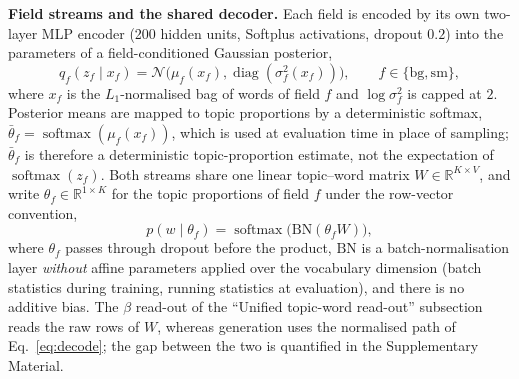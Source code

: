 \documentclass[Journal,letterpaper,NoLists]{ascelike-new}
\begin{document}
\noindent\textbf{Field streams and the shared decoder.} Each field is encoded by its own two-layer MLP encoder (200 hidden units, Softplus activations,
dropout $0.2$) into the parameters of a field-conditioned Gaussian posterior,
\begin{equation}
q_f(z_f\mid x_f)=\mathcal N\big(\mu_f(x_f),\operatorname{diag}(\sigma_f^2(x_f))\big),
\qquad f\in\{\mathrm{bg},\mathrm{sm}\},
\end{equation}
where $x_f$ is the $L_1$-normalised bag of words of field $f$ and $\log\sigma_f^2$ is capped at
$2$. Posterior means are mapped to topic proportions by a deterministic softmax,
$\bar\theta_f=\operatorname{softmax}(\mu_f(x_f))$, which is used at evaluation time in place of
sampling; $\bar\theta_f$ is therefore a deterministic topic-proportion estimate, not the
expectation of $\operatorname{softmax}(z_f)$. Both streams share one linear topic--word matrix
$W\in\mathbb{R}^{K\times V}$, and write $\theta_f\in\mathbb{R}^{1\times K}$ for the topic
proportions of field $f$ under the row-vector convention,
\begin{equation}
p(w\mid\theta_f)=\operatorname{softmax}\!\big(\mathrm{BN}(\theta_f W)\big),
\label{eq:decode}
\end{equation}
where $\theta_f$ passes through dropout before the product, $\mathrm{BN}$ is a batch-normalisation
layer \emph{without} affine parameters applied over the vocabulary dimension (batch statistics
during training, running statistics at evaluation), and there is no additive bias. The $\beta$
read-out of the ``Unified topic-word read-out'' subsection reads the raw rows of $W$, whereas generation uses the
normalised path of Eq.~\eqref{eq:decode}; the gap between the two is quantified in the
Supplementary Material.
\end{document}
